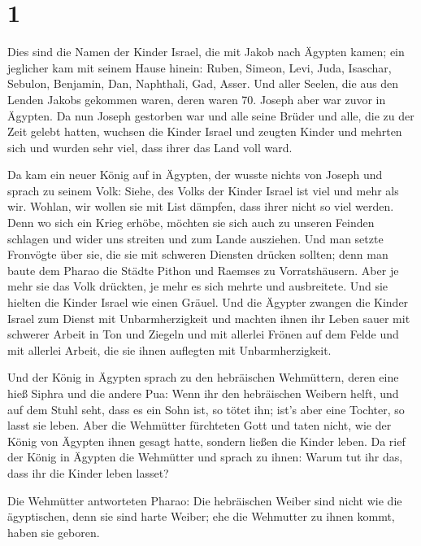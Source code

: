 \hypertarget{section}{%
\section{1}\label{section}}

 Dies sind die Namen der Kinder Israel, die mit Jakob nach
Ägypten kamen; ein jeglicher kam mit seinem Hause hinein: 
Ruben, Simeon, Levi, Juda,  Isaschar, Sebulon, Benjamin,
 Dan, Naphthali, Gad, Asser.  Und aller Seelen,
die aus den Lenden Jakobs gekommen waren, deren waren 70. Joseph aber
war zuvor in Ägypten.  Da nun Joseph gestorben war und alle
seine Brüder und alle, die zu der Zeit gelebt hatten, 
wuchsen die Kinder Israel und zeugten Kinder und mehrten sich und wurden
sehr viel, dass ihrer das Land voll ward.

 Da kam ein neuer König auf in Ägypten, der wusste nichts
von Joseph  und sprach zu seinem Volk: Siehe, des Volks der
Kinder Israel ist viel und mehr als wir.  Wohlan, wir
wollen sie mit List dämpfen, dass ihrer nicht so viel werden. Denn wo
sich ein Krieg erhöbe, möchten sie sich auch zu unseren Feinden schlagen
und wider uns streiten und zum Lande ausziehen.  Und man
setzte Fronvögte über sie, die sie mit schweren Diensten drücken
sollten; denn man baute dem Pharao die Städte Pithon und Raemses zu
Vorratshäusern.  Aber je mehr sie das Volk drückten, je
mehr es sich mehrte und ausbreitete. Und sie hielten die Kinder Israel
wie einen Gräuel.  Und die Ägypter zwangen die Kinder
Israel zum Dienst mit Unbarmherzigkeit  und machten ihnen
ihr Leben sauer mit schwerer Arbeit in Ton und Ziegeln und mit allerlei
Frönen auf dem Felde und mit allerlei Arbeit, die sie ihnen auflegten
mit Unbarmherzigkeit.

 Und der König in Ägypten sprach zu den hebräischen
Wehmüttern, deren eine hieß Siphra und die andere Pua: 
Wenn ihr den hebräischen Weibern helft, und auf dem Stuhl seht, dass es
ein Sohn ist, so tötet ihn; ist's aber eine Tochter, so lasst sie leben.
 Aber die Wehmütter fürchteten Gott und taten nicht, wie
der König von Ägypten ihnen gesagt hatte, sondern ließen die Kinder
leben.  Da rief der König in Ägypten die Wehmütter und
sprach zu ihnen: Warum tut ihr das, dass ihr die Kinder leben lasset?

 Die Wehmütter antworteten Pharao: Die hebräischen Weiber
sind nicht wie die ägyptischen, denn sie sind harte Weiber; ehe die
Wehmutter zu ihnen kommt, haben sie geboren.

